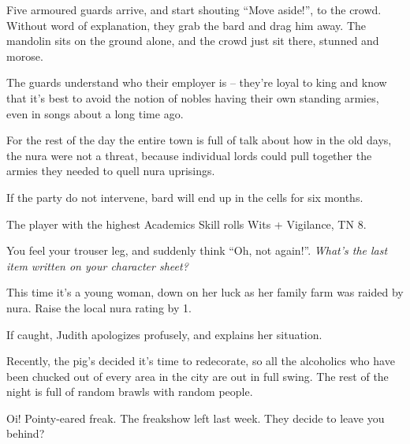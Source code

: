 \begin{multicols}{2}
\begin{boxtext}
	Five armoured guards arrive, and start shouting ``Move aside!'', to the crowd.  Without word of explanation, they grab the bard and drag him away.  The mandolin sits on the ground alone, and the crowd just sit there, stunned and morose.
\end{boxtext}

The guards understand who their employer is -- they're loyal to \gls{king} and know that it's best to avoid the notion of nobles having their own standing armies, even in songs about a long time ago.

For the rest of the day the entire town is full of talk about how in the old days, the nura were not a threat, because individual lords could pull together the armies they needed to quell nura uprisings.

If the party do not intervene, \gls{bard} will end up in the cells for six months.


The player with the highest Academics Skill rolls Wits + Vigilance, TN 8.

\begin{boxtext}

	You feel your trouser leg, and suddenly think ``Oh, not again!''.  \textit{What's the last item written on your character sheet?}

\end{boxtext}

This time it's a young woman, down on her luck as her family farm was raided by nura.  Raise the local nura rating by 1.

If caught, Judith apologizes profusely, and explains her situation.


\humanthief


Recently, the \gls{pig}'s decided it's time to redecorate, so all the alcoholics who have been chucked out of every area in the city are out in full swing.
The rest of the night is full of random brawls with random people.

\begin{boxtext}

	Oi! Pointy-eared freak.  The freakshow left last week.  They decide to leave you behind?

\end{boxtext}


\end{multicols}

